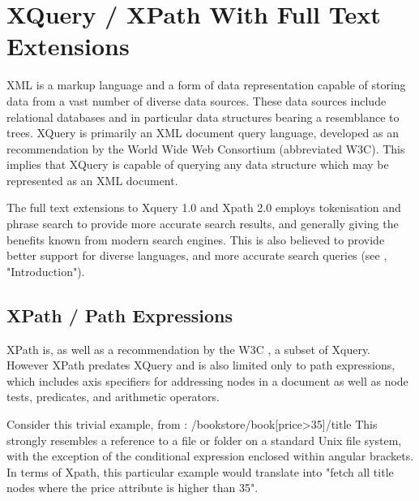 \section{XQuery / XPath With Full Text Extensions}
\label{sect:theory:xquery}
XML is a markup language and a form of data representation capable of storing
data from a vast number of diverse data sources. These data sources include
relational databases and in particular data structures bearing a resemblance to
trees. XQuery is primarily an XML document query language, developed as an
recommendation by the World Wide Web Consortium\cite{w3c00} (abbreviated W3C).
This implies that XQuery is capable of querying any data structure which may be
represented as an XML document.

The full text extensions to Xquery 1.0 and Xpath 2.0 employs tokenisation and
phrase search to provide more accurate search results, and generally giving the
benefits known from modern search engines. This is also believed to provide
better support for diverse languages, and more accurate search queries (see
\cite{w3c02}, "Introduction").

\subsection{XPath / Path Expressions}
XPath is, as well as a recommendation by the W3C \cite{w3c01}, a subset of
Xquery. However XPath predates XQuery and is also limited only to path
expressions, which includes axis specifiers for addressing nodes in a document
as well as node tests, predicates, and arithmetic operators.

Consider this trivial example, from \cite{w3s00}:
/bookstore/book[price>35]/title
This strongly resembles a reference to a file or folder on a standard Unix file
system, with the exception of the conditional expression enclosed within
angular brackets. In terms of Xpath, this particular example would translate
into "fetch all title nodes where the price attribute is higher than 35".       

